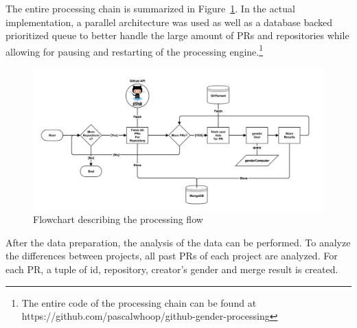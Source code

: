 The entire processing chain is summarized in Figure~\ref{figure:flowchart_processing}. In the actual implementation, a parallel architecture was used as well as a database backed prioritized queue to better handle the large amount of \ac{PR}s and repositories while allowing for pausing and restarting of the processing engine.\footnote{The entire code of the processing chain can be found at https://github.com/pascalwhoop/github-gender-processing}

\begin{figure}[!t]
\centering
\includegraphics[width=\textwidth]{graphics/flowchart_processing.png}
\caption{Flowchart describing the processing flow}
\label{figure:flowchart_processing}
\end{figure}



After the data preparation, the analysis of the data can be performed. To analyze the differences between projects, all past \ac{PR}s of each project are analyzed. For each \ac{PR}, a tuple of id, repository, creator's gender and merge result is created.












